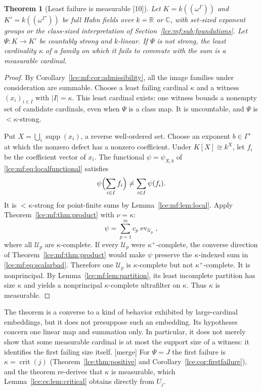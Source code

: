\documentclass[11pt,letterpaper]{article}
\numberwithin{equation}{section}
\newtheorem{theorem}{Theorem}[section]
\theoremstyle{definition}
\theoremstyle{remark}
\newcommand{\R}{\mathbb R}
\newcommand{\C}{\mathbb C}
\newcommand{\supp}{\operatorname{supp}}
\newcommand{\crit}{\operatorname{crit}}
\newcommand{\abs}[1]{\lvert#1\rvert}
\newcommand{\thref}[1]{Theorem~\ref{#1}}
\newcommand{\leref}[1]{Lemma~\ref{#1}}
\newcommand{\src}[1]{\textup{\textsf{\small[#1]}}}%
\newcommand{\mergetag}{\textup{\textsf{\small[merge]}}}%
\newcommand{\HF}[2]{#1((\omega^{#2}))}
\newcommand{\ev}{\operatorname{ev}}
\begin{document}
\begin{theorem}[Least failure is measurable \src{10}]\label{lce:mf:thm:spectrum}
Let $K=\HF k\Gamma$ and $K'=\HF k{\Gamma'}$ be full Hahn fields over $k=\R$
or $\C$, with set-sized exponent groups or the class-sized interpretation of
Section~\ref{lce:mf:sub:foundations}. Let $\Psi:K\to K'$ be countably strong
and $k$-linear. If $\Psi$ is not strong, the least cardinality $\kappa$ of a
family on which it fails to commute with the sum is a measurable cardinal.
\end{theorem}
\begin{proof}
By Corollary~\ref{lce:mf:cor:admissibility}, all the image families under
consideration are summable. Choose a least failing cardinal $\kappa$ and a
witness $(x_i)_{i\in I}$ with $\abs I=\kappa$. This least cardinal exists:
one witness bounds a nonempty set of candidate cardinals, even when $\Psi$
is a class map. It is uncountable, and $\Psi$ is ${<}\kappa$-strong.

Put $X=\bigcup_i\supp(x_i)$, a reverse well-ordered set. Choose an exponent
$b\in\Gamma'$ at which the nonzero defect has a nonzero coefficient. Under
$K[X]\cong k^X$, let $f_i$ be the coefficient vector of $x_i$. The
functional $\psi=\psi_{X,b}$ of \eqref{lce:mf:eq:localfunctional}
satisfies
\begin{equation}\label{lce:mf:eq:scalarbad}
 \psi\Bigl(\sum_{i\in I}f_i\Bigr)\ne\sum_{i\in I}\psi(f_i).
\end{equation}
It is ${<}\kappa$-strong for point-finite sums by \leref{lce:mf:lem:local}.
Apply \thref{lce:mf:thm:product} with $\nu=\kappa$:
\[
 \psi=\sum_{p=1}^mc_p\ev_{\mathcal U_p},
\]
where all $\mathcal U_p$ are $\kappa$-complete. If every $\mathcal U_p$ were
$\kappa^+$-complete, the converse direction of \thref{lce:mf:thm:product}
would make $\psi$ preserve the $\kappa$-indexed sum in
\eqref{lce:mf:eq:scalarbad}. Therefore one $\mathcal U_p$ is
$\kappa$-complete but not $\kappa^+$-complete. It is nonprincipal. By
\leref{lce:mf:lem:partition}, its least incomplete partition has size
$\kappa$ and yields a nonprincipal $\kappa$-complete ultrafilter on
$\kappa$. Thus $\kappa$ is measurable.
\end{proof}

The theorem is a converse to a kind of behavior exhibited by large-cardinal
embeddings, but it does not presuppose such an embedding. Its hypotheses
concern one linear map and summation only. In particular, it does not
merely show that some measurable cardinal is at most the support size of a
witness: it identifies the first failing size itself.
\mergetag{} For $\Psi=J$ the first failure is $\kappa=\crit(j)$
(\thref{lce:thm:positive} and Corollary~\ref{lce:cor:firstfailure}), and
the theorem re-derives that $\kappa$ is measurable, which
\leref{lce:cs:lem:critical} obtains directly from $U_j$.
\end{document}
